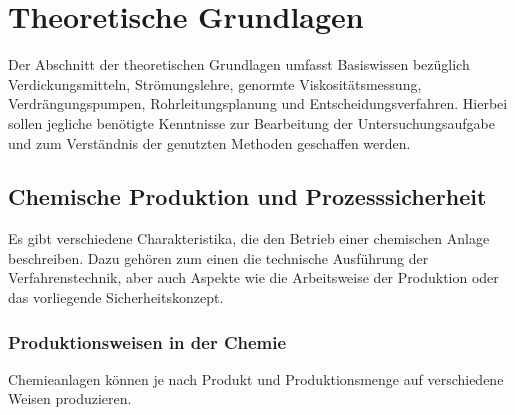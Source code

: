 \newpage
\section{Theoretische Grundlagen}
\label{sec:grundlagen}

Der Abschnitt der theoretischen Grundlagen umfasst Basiswissen bezüglich Verdickungsmitteln, Strömungslehre, genormte Viskositätsmessung, Verdrängungspumpen, Rohrleitungsplanung und Entscheidungsverfahren. Hierbei sollen jegliche benötigte Kenntnisse zur Bearbeitung der Untersuchungsaufgabe und zum Verständnis der genutzten Methoden geschaffen werden.


\subsection{Chemische Produktion und Prozesssicherheit}
Es gibt verschiedene Charakteristika, die den Betrieb einer chemischen Anlage beschreiben. Dazu gehören zum einen die technische Ausführung der Verfahrenstechnik, aber auch Aspekte wie die Arbeitsweise der Produktion oder das vorliegende Sicherheitskonzept.

\subsubsection{Produktionsweisen in der Chemie}
Chemieanlagen können je nach Produkt und Produktionsmenge auf verschiedene Weisen produzieren.
 
